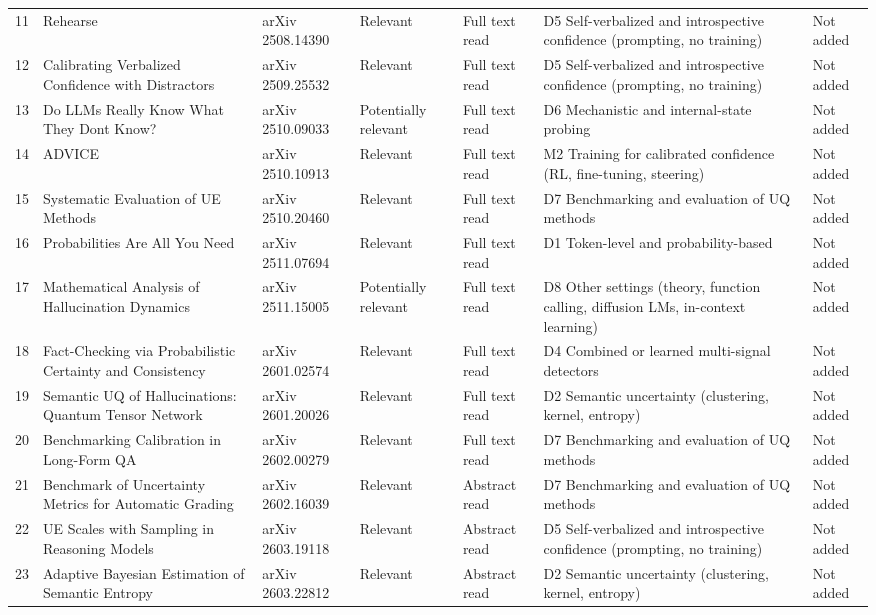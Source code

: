 \documentclass[acmsmall]{acmart}
\begin{document}
\begin{center}
\begin{longtable}{@{}r p{3.0cm} p{2.0cm} p{1.5cm} p{2.3cm} p{2.6cm} p{1.2cm}@{}}
11 & Rehearse & arXiv 2508.14390 & Relevant & Full text read & D5 Self-verbalized and introspective confidence (prompting, no training) & Not added \\
12 & Calibrating Verbalized Confidence with Distractors & arXiv 2509.25532 & Relevant & Full text read & D5 Self-verbalized and introspective confidence (prompting, no training) & Not added \\
13 & Do LLMs Really Know What They Dont Know? & arXiv 2510.09033 & Potentially relevant & Full text read & D6 Mechanistic and internal-state probing & Not added \\
14 & ADVICE & arXiv 2510.10913 & Relevant & Full text read & M2 Training for calibrated confidence (RL, fine-tuning, steering) & Not added \\
15 & Systematic Evaluation of UE Methods & arXiv 2510.20460 & Relevant & Full text read & D7 Benchmarking and evaluation of UQ methods & Not added \\
16 & Probabilities Are All You Need & arXiv 2511.07694 & Relevant & Full text read & D1 Token-level and probability-based & Not added \\
17 & Mathematical Analysis of Hallucination Dynamics & arXiv 2511.15005 & Potentially relevant & Full text read & D8 Other settings (theory, function calling, diffusion LMs, in-context learning) & Not added \\
18 & Fact-Checking via Probabilistic Certainty and Consistency & arXiv 2601.02574 & Relevant & Full text read & D4 Combined or learned multi-signal detectors & Not added \\
19 & Semantic UQ of Hallucinations: Quantum Tensor Network & arXiv 2601.20026 & Relevant & Full text read & D2 Semantic uncertainty (clustering, kernel, entropy) & Not added \\
20 & Benchmarking Calibration in Long-Form QA & arXiv 2602.00279 & Relevant & Full text read & D7 Benchmarking and evaluation of UQ methods & Not added \\
21 & Benchmark of Uncertainty Metrics for Automatic Grading & arXiv 2602.16039 & Relevant & Abstract read & D7 Benchmarking and evaluation of UQ methods & Not added \\
22 & UE Scales with Sampling in Reasoning Models & arXiv 2603.19118 & Relevant & Abstract read & D5 Self-verbalized and introspective confidence (prompting, no training) & Not added \\
23 & Adaptive Bayesian Estimation of Semantic Entropy & arXiv 2603.22812 & Relevant & Abstract read & D2 Semantic uncertainty (clustering, kernel, entropy) & Not added \\

\end{longtable}
\end{center}
\end{document}
